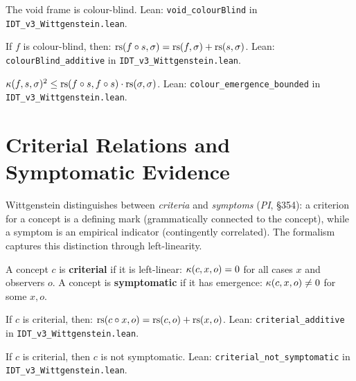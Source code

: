 \begin{theorem}
\label{thm:void-colour-blind}
The void frame is colour-blind.
Lean: \texttt{void\_colourBlind} in \texttt{IDT\_v3\_Wittgenstein.lean}.
\end{theorem}

\begin{theorem}
\label{thm:colour-blind-additive}
If $f$ is colour-blind, then:
$\mathrm{rs}(f \circ s, \sigma) = \mathrm{rs}(f, \sigma) + \mathrm{rs}(s, \sigma)$.
Lean: \texttt{colourBlind\_additive} in \texttt{IDT\_v3\_Wittgenstein.lean}.
\end{theorem}

\begin{theorem}
\label{thm:colour-emergence-bounded}
$\kappa(f, s, \sigma)^2 \leq \mathrm{rs}(f \circ s, f \circ s) \cdot
\mathrm{rs}(\sigma, \sigma)$.
Lean: \texttt{colour\_emergence\_bounded} in
\texttt{IDT\_v3\_Wittgenstein.lean}.
\end{theorem}

\section{Criterial Relations and Symptomatic Evidence}

Wittgenstein distinguishes between \emph{criteria} and \emph{symptoms}
(\textit{PI}, \S354): a criterion for a concept is a defining mark
(grammatically connected to the concept), while a symptom is an empirical
indicator (contingently correlated). The formalism captures this distinction
through left-linearity.

\begin{definition}
\label{def:criterial}
A concept $c$ is \textbf{criterial} if it is left-linear:
$\kappa(c, x, o) = 0$ for all cases $x$ and observers $o$.
A concept is \textbf{symptomatic} if it has emergence:
$\kappa(c, x, o) \neq 0$ for some $x, o$.
\end{definition}

\begin{theorem}
\label{thm:criterial-additive}
If $c$ is criterial, then:
$\mathrm{rs}(c \circ x, o) = \mathrm{rs}(c, o) + \mathrm{rs}(x, o)$.
Lean: \texttt{criterial\_additive} in \texttt{IDT\_v3\_Wittgenstein.lean}.
\end{theorem}

\begin{theorem}
\label{thm:criterial-not-symptomatic}
If $c$ is criterial, then $c$ is not symptomatic.
Lean: \texttt{criterial\_not\_symptomatic} in
\texttt{IDT\_v3\_Wittgenstein.lean}.
\end{theorem}

